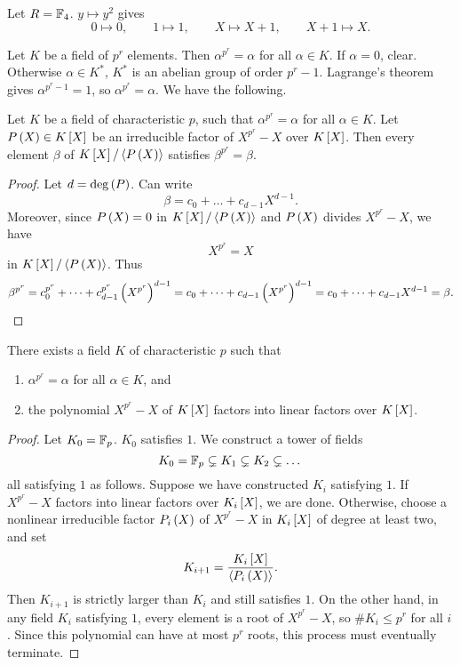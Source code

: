 \begin{example*}
Let $ R = \F_4 $. $ y \mapsto y^2 $ gives
$$ 0 \mapsto 0, \qquad 1 \mapsto 1, \qquad X \mapsto X + 1, \qquad X + 1 \mapsto X. $$
\end{example*}

Let $ K $ be a field of $ p^r $ elements. Then $ \alpha^{p^r} = \alpha $ for all $ \alpha \in K $. If $ \alpha = 0 $, clear. Otherwise $ \alpha \in K^* $, $ K^* $ is an abelian group of order $ p^r - 1 $. Lagrange's theorem gives $ \alpha^{p^r - 1} = 1 $, so $ \alpha^{p^r} = \alpha $. We have the following.

\begin{proposition}
Let $ K $ be a field of characteristic $ p $, such that $ \alpha^{p^r} = \alpha $ for all $ \alpha \in K $. Let $ P\rb{X} \in K\sb{X} $ be an irreducible factor of $ X^{p^r} - X $ over $ K\sb{X} $. Then every element $ \beta $ of $ K\sb{X} / \ab{P\rb{X}} $ satisfies $ \beta^{p^r} = \beta $.
\end{proposition}

\begin{proof}
Let $ d = \deg\rb{P} $. Can write
$$ \beta = c_0 + \dots + c_{d - 1}X^{d - 1}. $$
Moreover, since $ P\rb{X} = 0 $ in $ K\sb{X} / \ab{P\rb{X}} $ and $ P\rb{X} $ divides $ X^{p^r} - X $, we have
$$ X^{p^r} = X $$
in $ K\sb{X} / \ab{P\rb{X}} $. Thus
$$ \beta^{p^r} = c_0^{p^r} + \dots + c_{d - 1}^{p^r}\rb{X^{p^r}}^{d - 1} = c_0 + \dots + c_{d - 1}\rb{X^{p^r}}^{d - 1} = c_0 + \dots + c_{d - 1}X^{d - 1} = \beta. $$
\end{proof}

\begin{corollary}
There exists a field $ K $ of characteristic $ p $ such that
\begin{enumerate}
\item $ \alpha^{p^r} = \alpha $ for all $ \alpha \in K $, and
\item the polynomial $ X^{p^r} - X $ of $ K\sb{X} $ factors into linear factors over $ K\sb{X} $.
\end{enumerate}
\end{corollary}

\begin{proof}
Let $ K_0 = \F_p $. $ K_0 $ satisfies $ 1 $. We construct a tower of fields
$$ K_0 = \F_p \subsetneq K_1 \subsetneq K_2 \subsetneq \dots $$
all satisfying $ 1 $ as follows. Suppose we have constructed $ K_i $ satisfying $ 1 $. If $ X^{p^r} - X $ factors into linear factors over $ K_i\sb{X} $, we are done. Otherwise, choose a nonlinear irreducible factor $ P_i\rb{X} $ of $ X^{p^r} - X $ in $ K_i\sb{X} $ of degree at least two, and set
$$ K_{i + 1} = \dfrac{K_i\sb{X}}{\ab{P_i\rb{X}}}. $$
Then $ K_{i + 1} $ is strictly larger than $ K_i $ and still satisfies $ 1 $. On the other hand, in any field $ K_i $ satisfying $ 1 $, every element is a root of $ X^{p^r} - X $, so $ \#K_i \le p^r $ for all $ i $. Since this polynomial can have at most $ p^r $ roots, this process must eventually terminate.
\end{proof}

